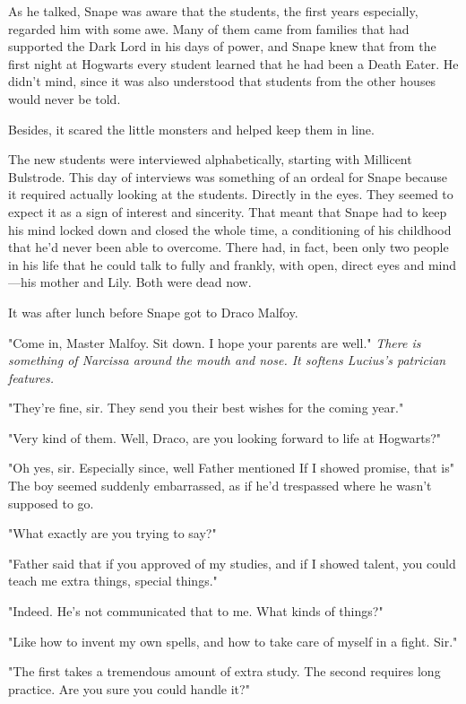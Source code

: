 As he talked, Snape was aware that the students, the first years especially, regarded him with some awe. Many of them came from families that had supported the Dark Lord in his days of power, and Snape knew that from the first night at Hogwarts every student learned that he had been a Death Eater. He didn't mind, since it was also understood that students from the other houses would never be told.

Besides, it scared the little monsters and helped keep them in line.

The new students were interviewed alphabetically, starting with Millicent Bulstrode. This day of interviews was something of an ordeal for Snape because it required actually looking at the students. Directly in the eyes. They seemed to expect it as a sign of interest and sincerity. That meant that Snape had to keep his mind locked down and closed the whole time, a conditioning of his childhood that he'd never been able to overcome. There had, in fact, been only two people in his life that he could talk to fully and frankly, with open, direct eyes and mind—his mother and Lily. Both were dead now.

It was after lunch before Snape got to Draco Malfoy.

"Come in, Master Malfoy. Sit down. I hope your parents are well." \emph{There is something of Narcissa around the mouth and nose. It softens Lucius's patrician features.}

"They're fine, sir. They send you their best wishes for the coming year."

"Very kind of them. Well, Draco, are you looking forward to life at Hogwarts?"

"Oh yes, sir. Especially since, well Father mentioned{\el} If I showed promise, that is{\el}" The boy seemed suddenly embarrassed, as if he'd trespassed where he wasn't supposed to go.

"What exactly are you trying to say?"

"Father said that if you approved of my studies, and if I showed talent, you could teach me extra things, special things."

"Indeed. He's not communicated that to me. What kinds of things?"

"Like how to invent my own spells, and how to take care of myself in a fight. Sir."

"The first takes a tremendous amount of extra study. The second requires long practice. Are you sure you could handle it?"


